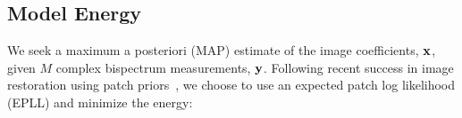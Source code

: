 {%
%
%
%
%

\vspace{-.05in}
\subsection{Model Energy}
\vspace{-.05in}

We seek a maximum a posteriori (MAP) estimate of the image coefficients, ${\bf x}$, given $M$ complex bispectrum measurements, ${\bf y}$.
Following recent success in image restoration using patch priors~\cite{zoran2011learning, zoran2012natural}, we choose to use an expected patch log likelihood (EPLL) and minimize the energy:

}
